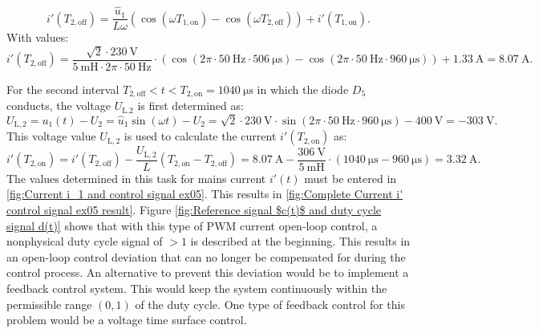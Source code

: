 \begin{solutionblock}
     \begin{equation}
        i'(T_\mathrm{2,off}) = \frac{\hat u_\mathrm{1}}{L \omega}(\cos (\omega T_\mathrm{1,on})- \cos(\omega T_\mathrm{2,off}))+ i'(T_\mathrm{1,on}).
    \end{equation}
    With values:
    \begin{equation}
        i'(T_\mathrm{2,off}) = \frac{\sqrt{2}\cdot\SI{230}{\volt}}{\SI{5}{\milli\henry}\cdot 2\pi \cdot \SI{50}{\hertz}}\cdot (\cos(2\pi \cdot \SI{50}{\hertz}\cdot \SI{506}{\micro\s})-\cos(2\pi \cdot \SI{50}{\hertz} \cdot \SI{960}{\micro\s})) + \SI{1.33}{\ampere}= \SI{8.07}{\ampere}.
     \end{equation}

     For the second interval $T_\mathrm{2,off} < t < T_\mathrm{2,on} = \SI{1040}{\micro\s}$ in which the diode $D_\mathrm{5}$ conducts, the voltage $U_\mathrm{L.2}$ is first determined as:
     \begin{equation}
        U_\mathrm{L,2} = u_\mathrm{1}(t) - U_\mathrm{2}= \hat u_\mathrm{1} \sin(\omega t) - U_\mathrm{2} = \sqrt{2} \cdot \SI{230}{\volt} \cdot \sin(2\pi \cdot \SI{50}{\hertz}\cdot \SI{960}{\micro\s}) - \SI{400}{\volt} = -\SI{303}{\volt}.
    \end{equation}
    This voltage value  $U_\mathrm{L,2}$ is used to calculate the current  $i'(T_\mathrm{2,on})$ as:
    \begin{equation}
        i'(T_\mathrm{2,on}) = i'(T_\mathrm{2,off}) -\frac{ U_\mathrm{L,2}}{L}(T_\mathrm{2,on}-T_\mathrm{2,off}) = \SI{8.07}{\ampere} -\frac{\SI{306}{\volt}}{\SI{5}{\milli\henry}}\cdot (\SI{1040}{\micro\s}-\SI{960}{\micro\s}) = \SI{3.32}{\ampere}.
    \end{equation}
    The values determined in this task for mains current
    $i'(t)$ must be entered in \autoref{fig:Current i_1 and control signal ex05}. This results in \autoref{fig:Complete Current i' control signal ex05 result}. Figure \autoref{fig:Reference signal $c(t)$ and duty cycle signal d(t)} shows that with this type of PWM current open-loop control, a nonphysical duty cycle signal of $>1$ is described at the beginning. This results in an open-loop control deviation that can no longer be compensated for during the control process. An alternative to prevent this deviation would be to implement a feedback control system. This would keep the system continuously within the permissible range $(0,1)$ of the duty cycle. One type of feedback control for this problem would be a voltage time surface control. 
\end{solutionblock}

